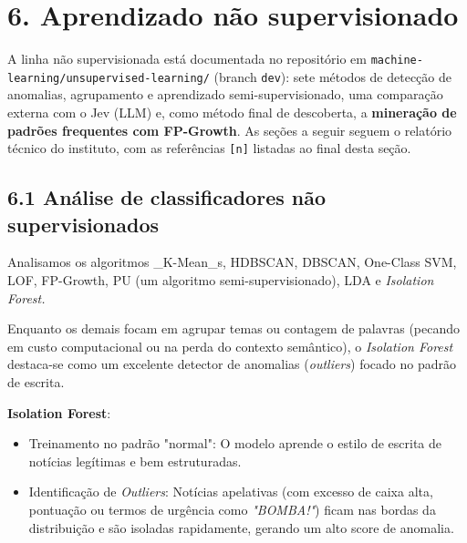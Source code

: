 \documentclass[
  brazilian,
  11pt,
]{article}
\providecommand{\tightlist}{%
  \setlength{\itemsep}{0pt}\setlength{\parskip}{0pt}}
\begin{document}
\section{6. Aprendizado não supervisionado}\label{aprendizado-nuxe3o-supervisionado}

A linha não supervisionada está documentada no repositório em \texttt{machine-learning/unsupervised-learning/} (branch \texttt{dev}): sete métodos de detecção de anomalias, agrupamento e aprendizado semi-supervisionado, uma comparação externa com o Jev (LLM) e, como método final de descoberta, a \textbf{mineração de padrões frequentes com FP-Growth}. As seções a seguir seguem o relatório técnico do instituto, com as referências \texttt{{[}n{]}} listadas ao final desta seção.

\subsection{6.1 Análise de classificadores não supervisionados}\label{anuxe1lise-de-classificadores-nuxe3o-supervisionados}

Analisamos os algoritmos \_K-Mean\_s, HDBSCAN, DBSCAN, One-Class SVM, LOF, FP-Growth, PU (um algoritmo semi-supervisionado), LDA e \emph{Isolation Forest.}

Enquanto os demais focam em agrupar temas ou contagem de palavras (pecando em custo computacional ou na perda do contexto semântico), o \emph{Isolation Forest} destaca-se como um excelente detector de anomalias (\emph{outliers}) focado no padrão de escrita.

\textbf{Isolation Forest}:

\begin{itemize}
\tightlist
\item
  Treinamento no padrão "normal": O modelo aprende o estilo de escrita de notícias legítimas e bem estruturadas.
\item
  Identificação de \emph{Outliers}: Notícias apelativas (com excesso de caixa alta, pontuação ou termos de urgência como \emph{"BOMBA!"}) ficam nas bordas da distribuição e são isoladas rapidamente, gerando um alto score de anomalia.
\end{itemize}
\end{document}
